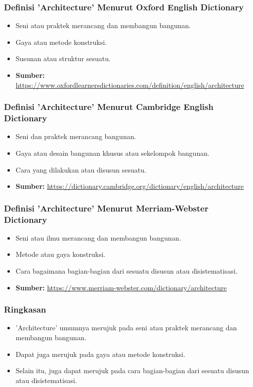 \documentclass{beamer}
\begin{document}
	\begin{frame}
		\frametitle{Definisi 'Architecture' Menurut Oxford English Dictionary}
		\begin{itemize}
			\item Seni atau praktek merancang dan membangun bangunan.
			\item Gaya atau metode konstruksi.
			\item Susunan atau struktur sesuatu.
			\item \textbf{Sumber:} \url{https://www.oxfordlearnersdictionaries.com/definition/english/architecture}
		\end{itemize}
	\end{frame}
	
	\begin{frame}
		\frametitle{Definisi 'Architecture' Menurut Cambridge English Dictionary}
		\begin{itemize}
			\item Seni dan praktek merancang bangunan.
			\item Gaya atau desain bangunan khusus atau sekelompok bangunan.
			\item Cara yang dilakukan atau disusun sesuatu.
			\item \textbf{Sumber:} \url{https://dictionary.cambridge.org/dictionary/english/architecture}
		\end{itemize}
	\end{frame}
	
	\begin{frame}
		\frametitle{Definisi 'Architecture' Menurut Merriam-Webster Dictionary}
		\begin{itemize}
			\item Seni atau ilmu merancang dan membangun bangunan.
			\item Metode atau gaya konstruksi.
			\item Cara bagaimana bagian-bagian dari sesuatu disusun atau disistematisasi.
			\item \textbf{Sumber:} \url{https://www.merriam-webster.com/dictionary/architecture}
		\end{itemize}
	\end{frame}
	
	\begin{frame}
		\frametitle{Ringkasan}
		\begin{itemize}
			\item 'Architecture' umumnya merujuk pada seni atau praktek merancang dan membangun bangunan.
			\item Dapat juga merujuk pada gaya atau metode konstruksi.
			\item Selain itu, juga dapat merujuk pada cara bagian-bagian dari sesuatu disusun atau disistematisasi.
		\end{itemize}
	\end{frame}
	
\end{document}
